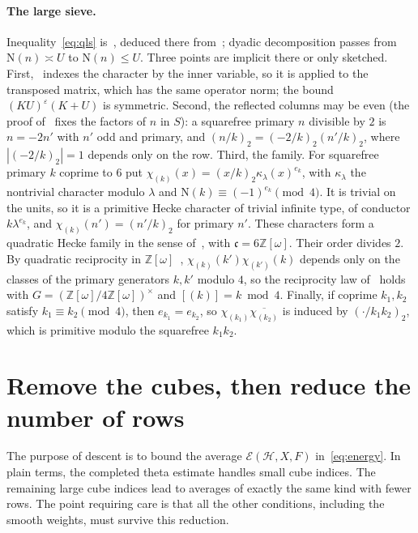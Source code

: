 \documentclass[11pt]{article}
\numberwithin{equation}{section}
\newcommand{\OO}{\mathbb Z[\omega]}
\newcommand{\N}{\mathrm N}
\newcommand{\E}{\mathcal E}
\begin{document}
\paragraph{The large sieve.} Inequality~\eqref{eq:qls} is~\cite[Lemma~6.5]{OAI1112}, deduced there
from~\cite[Theorem~1.1]{GL}; dyadic decomposition passes from $\N(n)\asymp U$ to $\N(n)\le U$. Three
points are implicit there or only sketched. First,~\cite{GL} indexes the character by the inner
variable, so it is applied to the transposed matrix, which has the same operator norm; the bound
$(KU)^\varepsilon(K+U)$ is symmetric. Second, the reflected columns may be even (the proof
of~\cite[Lemma~6.5]{OAI1112} fixes the factors of $n$ in $S$): a squarefree primary $n$ divisible by $2$
is $n=-2n'$ with $n'$ odd and primary, and $(n/k)_2=(-2/k)_2(n'/k)_2$, where $|(-2/k)_2|=1$ depends only
on the row. Third, the family. For squarefree primary $k$ coprime to $6$ put
$\chi_{(k)}(x)=(x/k)_2\kappa_\lambda(x)^{e_k}$, with $\kappa_\lambda$ the nontrivial character modulo
$\lambda$ and $\N(k)\equiv(-1)^{e_k}\pmod4$. It is trivial on the units, so it is a primitive Hecke
character of trivial infinite type, of conductor $k\lambda^{e_k}$, and $\chi_{(k)}(n')=(n'/k)_2$ for
primary $n'$. These characters form a quadratic Hecke family in the sense of~\cite[Definition~1]{GL},
with $\mathfrak c=6\OO$. Their order divides $2$. By quadratic reciprocity in $\OO$~\cite[\S8.5]{Lemmermeyer},
$\chi_{(k)}(k')\chi_{(k')}(k)$ depends only on the classes of the primary generators $k,k'$ modulo $4$, so
the reciprocity law of~\cite[Definition~1]{GL} holds with $G=(\OO/4\OO)^\times$ and $[(k)]=k\bmod4$.
Finally, if coprime $k_1,k_2$ satisfy $k_1\equiv k_2\pmod4$, then $e_{k_1}=e_{k_2}$, so
$\chi_{(k_1)}\overline{\chi_{(k_2)}}$ is induced by $(\cdot/k_1k_2)_2$, which is primitive modulo the
squarefree $k_1k_2$.

\section{Remove the cubes, then reduce the number of rows}\label{sec:descent}

The purpose of descent is to bound the average $\E(\mathcal H,X,F)$
in~\eqref{eq:energy}. In plain terms, the completed theta estimate
handles small cube indices. The remaining large cube indices lead to
averages of exactly the same kind with fewer rows. The point requiring
care is that all the other conditions, including the smooth weights,
must survive this reduction.
\end{document}
